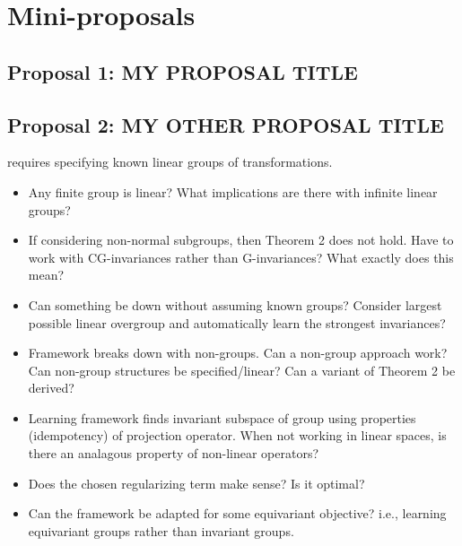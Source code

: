 

\section{Mini-proposals}

\subsection{Proposal 1: MY PROPOSAL TITLE} %


\subsection{Proposal 2: MY OTHER PROPOSAL TITLE} %



\parencite{Mouli:2021} requires specifying known linear groups of transformations.
\begin{itemize}

\item
Any finite group is linear? What implications are there with infinite linear groups?

\item
If considering non-normal subgroups, then Theorem 2 does not hold. Have to work with CG-invariances rather than G-invariances? What exactly does this mean?

\item
Can something be down without assuming known groups? Consider largest possible linear overgroup and automatically learn the strongest invariances?

\item
Framework breaks down with non-groups. Can a non-group approach work? Can non-group structures be specified/linear? Can a variant of Theorem 2 be derived?

\item
Learning framework finds invariant subspace of group using properties (idempotency) of projection operator. When not working in linear spaces, is there an analagous property of non-linear operators?

\item
Does the chosen regularizing term make sense? Is it optimal?

\item
Can the framework be adapted for some equivariant objective? i.e., learning equivariant groups rather than invariant groups.

\end{itemize}